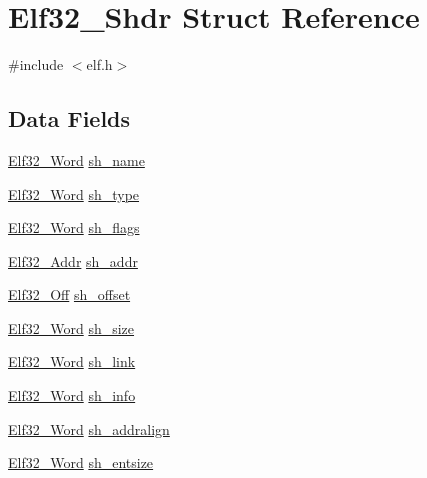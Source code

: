 \hypertarget{struct_elf32___shdr}{\section{Elf32\-\_\-\-Shdr Struct Reference}
\label{struct_elf32___shdr}
}


{\ttfamily \#include $<$elf.\-h$>$}

\subsection*{Data Fields}
\begin{DoxyCompactItemize}
\item 
\hyperlink{elf_8h_af5924ece606c732e86f8263a19408e45}{Elf32\-\_\-\-Word} \hyperlink{struct_elf32___shdr_ade8467fed394a2adebbac57ce1007742}{sh\-\_\-name}
\item 
\hyperlink{elf_8h_af5924ece606c732e86f8263a19408e45}{Elf32\-\_\-\-Word} \hyperlink{struct_elf32___shdr_a2a41bb54bee9e047efbf10185972395b}{sh\-\_\-type}
\item 
\hyperlink{elf_8h_af5924ece606c732e86f8263a19408e45}{Elf32\-\_\-\-Word} \hyperlink{struct_elf32___shdr_a23c0c41226f447a73c37d501692e75d7}{sh\-\_\-flags}
\item 
\hyperlink{elf_8h_a40c6d4571e6001f443cc6a6474620158}{Elf32\-\_\-\-Addr} \hyperlink{struct_elf32___shdr_a18c60e7404cee4ccf1e7a77445764bc4}{sh\-\_\-addr}
\item 
\hyperlink{elf_8h_a655751f9b317369b93c581ea8ed84516}{Elf32\-\_\-\-Off} \hyperlink{struct_elf32___shdr_a4fd90cfe25373b4d13599f2c55120dca}{sh\-\_\-offset}
\item 
\hyperlink{elf_8h_af5924ece606c732e86f8263a19408e45}{Elf32\-\_\-\-Word} \hyperlink{struct_elf32___shdr_a22b9e86344a0dff7e25af8e49f77b1e9}{sh\-\_\-size}
\item 
\hyperlink{elf_8h_af5924ece606c732e86f8263a19408e45}{Elf32\-\_\-\-Word} \hyperlink{struct_elf32___shdr_abc776cd861d04445e42019265581750f}{sh\-\_\-link}
\item 
\hyperlink{elf_8h_af5924ece606c732e86f8263a19408e45}{Elf32\-\_\-\-Word} \hyperlink{struct_elf32___shdr_a44bff009f8cd38b77854ca666a43cc3b}{sh\-\_\-info}
\item 
\hyperlink{elf_8h_af5924ece606c732e86f8263a19408e45}{Elf32\-\_\-\-Word} \hyperlink{struct_elf32___shdr_a63c4e1b5e5601867073efc0ee9d9ede4}{sh\-\_\-addralign}
\item 
\hyperlink{elf_8h_af5924ece606c732e86f8263a19408e45}{Elf32\-\_\-\-Word} \hyperlink{struct_elf32___shdr_ab8925d294ee527ad4d9a5f573cbfb3f8}{sh\-\_\-entsize}
\end{DoxyCompactItemize}


